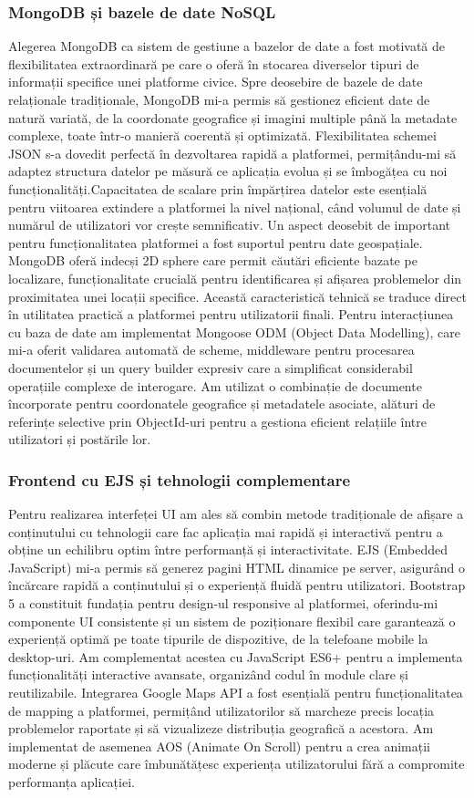 \documentclass[12pt,a4paper]{report}
\begin{document}
\subsubsection{MongoDB și bazele de date NoSQL}
Alegerea MongoDB ca sistem de gestiune a bazelor de date a fost motivată de flexibilitatea extraordinară pe care o oferă în stocarea diverselor tipuri de informații specifice unei platforme civice. Spre deosebire de bazele de date relaționale tradiționale, MongoDB mi-a permis să gestionez eficient date de natură variată, de la coordonate geografice și imagini multiple până la metadate complexe, toate într-o manieră coerentă și optimizată.
Flexibilitatea schemei JSON s-a dovedit perfectă în dezvoltarea rapidă a platformei, permițându-mi să adaptez structura datelor pe măsură ce aplicația evolua și se îmbogățea cu noi funcționalități.Capacitatea de scalare prin împărțirea datelor este esențială pentru viitoarea extindere a platformei la nivel național, când volumul de date și numărul de utilizatori vor crește semnificativ.
Un aspect deosebit de important pentru funcționalitatea platformei a fost suportul pentru date geospațiale. MongoDB oferă indecși 2D sphere care permit căutări eficiente bazate pe localizare, funcționalitate crucială pentru identificarea și afișarea problemelor din proximitatea unei locații specifice. Această caracteristică tehnică se traduce direct în utilitatea practică a platformei pentru utilizatorii finali.
Pentru interacțiunea cu baza de date am implementat Mongoose ODM (Object Data Modelling), care mi-a oferit validarea automată de scheme, middleware pentru procesarea documentelor și un query builder expresiv care a simplificat considerabil operațiile complexe de interogare. Am utilizat o combinație de documente încorporate pentru coordonatele geografice și metadatele asociate, alături de referințe selective prin ObjectId-uri pentru a gestiona eficient relațiile între utilizatori și postările lor.
\subsubsection{Frontend cu EJS și tehnologii complementare}
Pentru realizarea interfeței UI am ales să combin metode tradiționale de afișare a conținutului cu tehnologii care fac aplicația mai rapidă și interactivă pentru a obține un echilibru optim între performanță și interactivitate. EJS (Embedded JavaScript) mi-a permis să generez pagini HTML dinamice pe server, asigurând o încărcare rapidă a conținutului și o experiență fluidă pentru utilizatori.
Bootstrap 5 a constituit fundația pentru design-ul responsive al platformei, oferindu-mi componente UI consistente și un sistem de poziționare flexibil care garantează o experiență optimă pe toate tipurile de dispozitive, de la telefoane mobile la desktop-uri. Am complementat acestea cu JavaScript ES6+ pentru a implementa funcționalități interactive avansate, organizând codul în module clare și reutilizabile.
Integrarea Google Maps API a fost esențială pentru funcționalitatea de mapping a platformei, permițând utilizatorilor să marcheze precis locația problemelor raportate și să vizualizeze distribuția geografică a acestora. Am implementat de asemenea AOS (Animate On Scroll) pentru a crea animații moderne și plăcute care îmbunătățesc experiența utilizatorului fără a compromite performanța aplicației.
\end{document}
